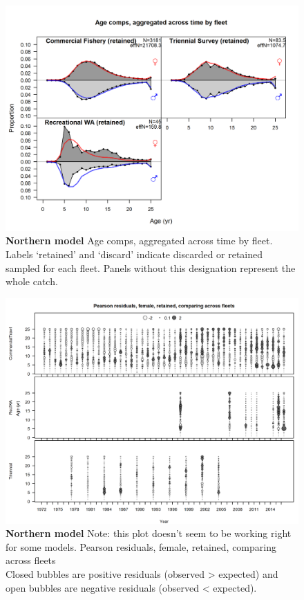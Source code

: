 \documentclass[12pt,]{article}
\begin{document}
\begin{figure}[htbp]
\centering
\includegraphics{./r4ss/plots_mod1/comp_agefit__aggregated_across_time.png}
\caption{\textbf{Northern model} Age comps, aggregated across time by
fleet. Labels `retained' and `discard' indicate discarded or retained
sampled for each fleet. Panels without this designation represent the
whole catch. \label{fig:mod1_14_comp_agefit__aggregated_across_time}}
\end{figure}

\begin{figure}[htbp]
\centering
\includegraphics{./r4ss/plots_mod1/comp_agefit_sex2mkt2_multi-fleet_comparison.png}
\caption{\textbf{Northern model} Note: this plot doesn't seem to be
working right for some models. Pearson residuals, female, retained,
comparing across fleets\\
Closed bubbles are positive residuals (observed \textgreater{} expected)
and open bubbles are negative residuals (observed \textless{} expected).
\label{fig:mod1_15_comp_agefit_sex2mkt2_multi-fleet_comparison}}
\end{figure}
\end{document}
